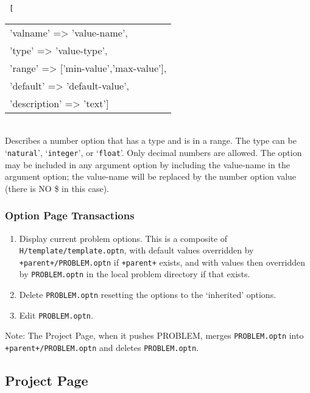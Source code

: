 \documentclass[12pt]{article}
\newenvironment{indpar}[1][0.4in]%
	{\begin{list}{}%
		     {\setlength{\itemsep}{0in}%
		      \setlength{\topsep}{0in}%
		      \setlength{\parsep}{1ex}%
		      \setlength{\labelwidth}{#1}%
		      \setlength{\leftmargin}{#1}%
		      \addtolength{\leftmargin}{\labelsep}}%
	 \item}%
	{\end{list}}
\newenvironment{itemlist}[1][0.2in]%
	{\begin{list}{}{\setlength{\labelwidth}{#1}%
		        \setlength{\leftmargin}{\labelwidth}%
		        \addtolength{\leftmargin}{+0.2in}%
		        \addtolength{\linewidth}{-\labelwidth}%
		        \addtolength{\linewidth}{-0.2in}%
		        \renewcommand{\makelabel}[1]{##1\hfill}}
	 \raggedright}%
	{\end{list}}
\newcommand{\EOL}{\penalty \exhyphenpenalty}
\begin{document}
\begin{indpar}
\begin{itemlist}
\medskip

\newsavebox{\numoptbox}
\begin{lrbox}{\numoptbox}
\tt
[\begin{tabular}[t]{l}
'valname' => 'value-name', \\
'type' => 'value-type', \\
'range' => ['min-value','max-value'], \\
'default' => 'default-value', \\
'description' => 'text'] \\
\end{tabular}
\end{lrbox}
\item[\tt 'option-name' => \usebox{\numoptbox}] ~ \\
Describes a number option that has a type and is in a
range.  The type can be `{\tt natural}', `{\tt integer}',
or `{\tt float}'.  Only decimal numbers are allowed.
The option may be included in any argument option by including
the value-name in the argument option; the value-name will
be replaced by the number option value (there is NO \$ in this case).

\end{itemlist}
\end{indpar}

\subsubsection{Option Page Transactions}

\begin{enumerate}
\item Display current problem options.  This is a composite
of {\tt H/template/template.optn}, with default values
overridden by {\tt +parent+/PROBLEM.optn}
if {\tt +parent+} exists, and with values then
overridden by {\tt PROBLEM.optn} in the local
problem directory if that exists.
\item Delete {\tt PROBLEM.optn} resetting the options
to the `inherited' options.
\item Edit {\tt PROBLEM.optn}.
\end{enumerate}

Note: The Project Page, when it pushes PROBLEM, merges
{\tt PROBLEM.optn} into {\tt +parent+/\EOL PROBLEM.optn} and
deletes {\tt PROBLEM.optn}.

\newpage

\subsection{Project Page}
\end{document}
